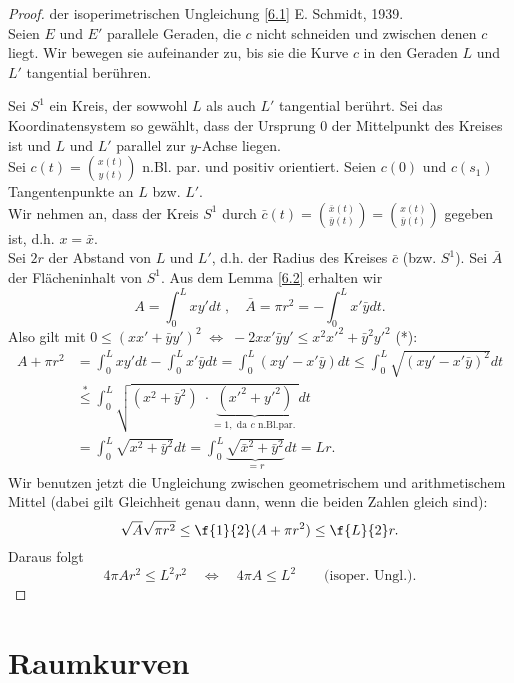 \documentclass{mycourse}
\newcommand{\vekt}[2]{\binom{#1}{#2}}   	%
\begin{document}
\begin{proof}{der isoperimetrischen Ungleichung \ref {6.1}}
E. Schmidt, 1939. \\
Seien $E$ und $E'$ parallele Geraden, die $c$ nicht schneiden und zwischen denen $c$ liegt. Wir bewegen sie aufeinander zu, bis sie die Kurve $c$ in den Geraden $L$ und $L'$ tangential berühren.

Sei $S^1$ ein Kreis, der sowwohl $L$ als auch $L'$ tangential berührt. Sei das Koordinatensystem so gewählt, dass der Ursprung $0$ der Mittelpunkt des Kreises ist und $L$ und $L'$ parallel zur $y$-Achse liegen. \\
Sei $c(t) = \vekt{x(t)}{y(t)}$ n.Bl. par. und positiv orientiert. Seien $c(0)$ und $c(s_1)$ Tangentenpunkte an $L$ bzw. $L'$. \\
{\color{orange} Wir nehmen an, dass der Kreis $S^1$ durch $ \bar{c}(t) = \vekt{\bar{x}(t)}{\bar{y}(t)} = \vekt{x(t)}{\bar{y}(t)}$ gegeben ist, d.h. $x = \bar {x}$.} \\ 
Sei $2 r$ der Abstand von $L$ und $L'$, d.h. der Radius des Kreises $\bar{c}$ (bzw. $S^1$). Sei $\bar{A}$ der Flächeninhalt von $S^1$. Aus dem Lemma \ref{6.2} erhalten wir 
\[ A = \int_0^L x y' dt \; , \quad \bar{A} = \pi r^2 = - \int_0^L x' \bar{y} dt. \]
Also gilt mit  $0 \leq (x x' + \bar{y} y')^2 \; \Leftrightarrow \; - 2 x x' \bar{y} y' \leq x^2 x'^2 + \bar{y}^2 y'^2$ (*):
\begin{align*}
A + \pi r^2 &= \int_0^L x y' dt - \int_0^L x' \bar{y} dt = \int_0^L (x y' - x' \bar{y}) dt \leq \int_0^L \sqrt{(x y' - x' \bar{y})^2} dt \\
&\stackrel{*}{\leq} \int_0^L \sqrt{(x^2 + \bar{y}^2) \; \cdot \underbrace{(x'^2 + y'^2)}_{= 1, \text{ da $c$ n.Bl.par. }}} dt  \\
&= \int_0^L \sqrt{x^2 + \bar{y}^2} dt = \int_0^L \underbrace{\sqrt{\bar{x}^2 + \bar{y}^2}}_{= r} dt = Lr.
\end{align*}
Wir benutzen jetzt die Ungleichung zwischen geometrischem und arithmetischem Mittel (dabei gilt Gleichheit genau dann, wenn die beiden Zahlen gleich sind):
\[ \sqrt{A} \sqrt{\pi r^2} \leq \f{1}{2} (A + \pi r^2) \leq \f{L}{2} r. \]
Daraus folgt 
\[ 4 \pi A r^2 \leq L^2 r^2 \quad  \Longleftrightarrow \quad 4 \pi A \leq L^2  \qquad \text{(isoper. Ungl.)} .\]

\end{proof}


\section{Raumkurven}
\end{document}

